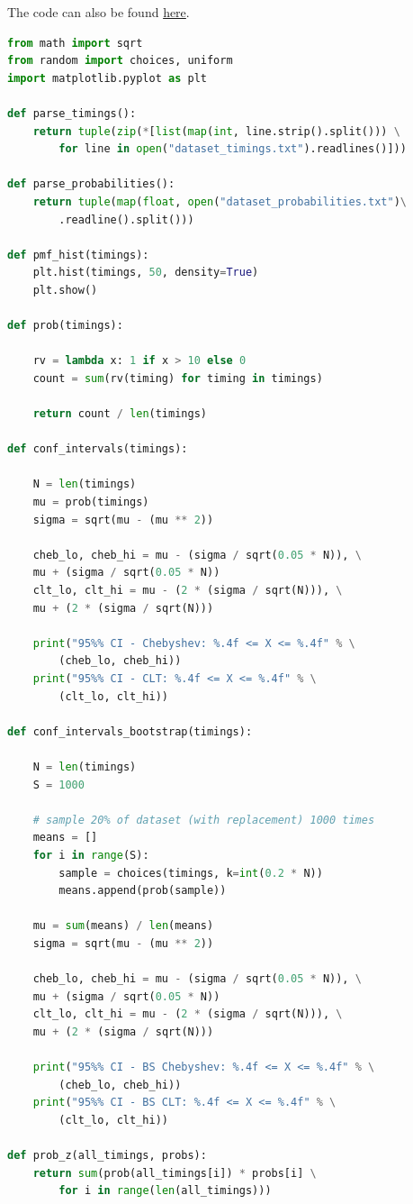 \documentclass[12pt]{article}
\begin{document}
\noindent The code can also be found  \href{https://raw.githubusercontent.com/conormccauley1999/College/master/ST3009\%20-\%20Statistical\%20Methods\%20for\%20Computer\%20Science/Mid-Term\%20Assignment/code.py}{here}.

\begin{lstlisting}[language=Python]
from math import sqrt
from random import choices, uniform
import matplotlib.pyplot as plt

def parse_timings():
	return tuple(zip(*[list(map(int, line.strip().split())) \
		for line in open("dataset_timings.txt").readlines()]))

def parse_probabilities():
	return tuple(map(float, open("dataset_probabilities.txt")\
		.readline().split()))

def pmf_hist(timings):
	plt.hist(timings, 50, density=True)
	plt.show()

def prob(timings):

	rv = lambda x: 1 if x > 10 else 0
	count = sum(rv(timing) for timing in timings)

	return count / len(timings)

def conf_intervals(timings):

	N = len(timings)
	mu = prob(timings)
	sigma = sqrt(mu - (mu ** 2))

	cheb_lo, cheb_hi = mu - (sigma / sqrt(0.05 * N)), \
	mu + (sigma / sqrt(0.05 * N))
	clt_lo, clt_hi = mu - (2 * (sigma / sqrt(N))), \
	mu + (2 * (sigma / sqrt(N)))

	print("95%% CI - Chebyshev: %.4f <= X <= %.4f" % \
		(cheb_lo, cheb_hi))
	print("95%% CI - CLT: %.4f <= X <= %.4f" % \
		(clt_lo, clt_hi))

def conf_intervals_bootstrap(timings):
	
	N = len(timings)
	S = 1000
	
	# sample 20% of dataset (with replacement) 1000 times
	means = []
	for i in range(S):
		sample = choices(timings, k=int(0.2 * N))
		means.append(prob(sample))

	mu = sum(means) / len(means)
	sigma = sqrt(mu - (mu ** 2))
	
	cheb_lo, cheb_hi = mu - (sigma / sqrt(0.05 * N)), \
	mu + (sigma / sqrt(0.05 * N))
	clt_lo, clt_hi = mu - (2 * (sigma / sqrt(N))), \
	mu + (2 * (sigma / sqrt(N)))

	print("95%% CI - BS Chebyshev: %.4f <= X <= %.4f" % \
		(cheb_lo, cheb_hi))
	print("95%% CI - BS CLT: %.4f <= X <= %.4f" % \
		(clt_lo, clt_hi))

def prob_z(all_timings, probs):
	return sum(prob(all_timings[i]) * probs[i] \
		for i in range(len(all_timings)))


\end{lstlisting}
\end{document}
